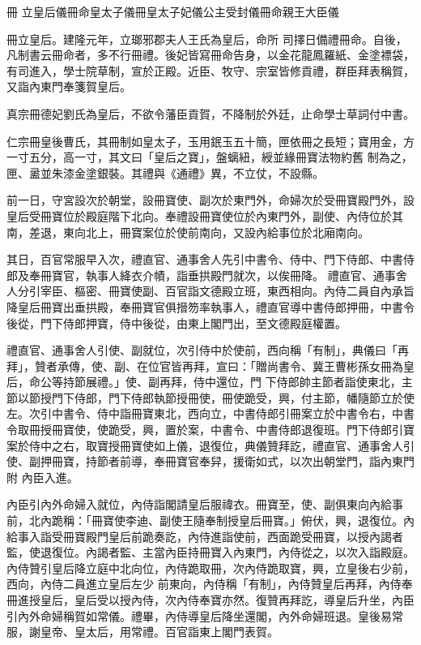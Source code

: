 
\begin{pinyinscope}

 冊
 立皇后儀冊命皇太子儀冊皇太子妃儀公主受封儀冊命親王大臣儀



 冊立皇后。建隆元年，立瑯邪郡夫人王氏為皇后，命所
 司擇日備禮冊命。自後，凡制書云冊命者，多不行冊禮。後妃皆寫冊命告身，以金花龍鳳羅紙、金塗褾袋，有司進入，學士院草制，宣於正殿。近臣、牧守、宗室皆修貢禮，群臣拜表稱賀，又詣內東門奉箋賀皇后。



 真宗冊德妃劉氏為皇后，不欲令藩臣貢賀，不降制於外廷，止命學士草詞付中書。



 仁宗冊皇後曹氏，其冊制如皇太子，玉用鈱玉五十簡，匣依冊之長短；寶用金，方一寸五分，高一寸，其文曰「皇后之寶」，盤螭紐，綬並緣冊寶法物約舊
 制為之，匣、盝並朱漆金塗銀裝。其禮與《通禮》異，不立仗，不設縣。



 前一日，守宮設次於朝堂，設冊寶使、副次於東門外，命婦次於受冊寶殿門外，設皇后受冊寶位於殿庭階下北向。奉禮設冊寶使位於內東門外，副使、內侍位於其南，差退，東向北上，冊寶案位於使前南向，又設內給事位於北廂南向。



 其日，百官常服早入次，禮直官、通事舍人先引中書令、侍中、門下侍郎、中書侍郎及奉冊寶官，執事人絳衣介幘，詣垂拱殿門就次，以俟冊降。
 禮直官、通事舍人分引宰臣、樞密、冊寶使副、百官詣文德殿立班，東西相向。內侍二員自內承旨降皇后冊寶出垂拱殿，奉冊寶官俱搢笏率執事人，禮直官導中書侍郎押冊，中書令後從，門下侍郎押寶，侍中後從，由東上閣門出，至文德殿庭權置。



 禮直官、通事舍人引使、副就位，次引侍中於使前，西向稱「有制」，典儀曰「再拜」，贊者承傳，使、副、在位官皆再拜，宣曰：「贈尚書令、冀王曹彬孫女冊為皇后，命公等持節展禮。」使、副再拜，侍中還位，門
 下侍郎帥主節者詣使東北，主節以節授門下侍郎，門下侍郎執節授冊使，冊使跪受，興，付主節，幡隨節立於使左。次引中書令、侍中詣冊寶東北，西向立，中書侍郎引冊案立於中書令右，中書令取冊授冊寶使，使跪受，興，置於案，中書令、中書侍郎退復班。門下侍郎引寶案於侍中之右，取寶授冊寶使如上儀，退復位，典儀贊拜訖，禮直官、通事舍人引使、副押冊寶，持節者前導，奉冊寶官奉舁，援衛如式，以次出朝堂門，詣內東門附
 內臣入進。



 內臣引內外命婦入就位，內侍詣閣請皇后服禕衣。冊寶至，使、副俱東向內給事前，北內跪稱：「冊寶使李迪、副使王隨奉制授皇后冊寶。」俯伏，興，退復位。內給事入詣受冊寶殿門皇后前跪奏訖，內侍進詣使前，西面跪受冊寶，以授內謁者監，使退復位。內謁者監、主當內臣持冊寶入內東門，內侍從之，以次入詣殿庭。內侍贊引皇后降立庭中北向位，內侍跪取冊，次內侍跪取寶，興，立皇後右少前，西向，內侍二員進立皇后左少
 前東向，內侍稱「有制」，內侍贊皇后再拜，內侍奉冊進授皇后，皇后受以授內侍，次內侍奉寶亦然。復贊再拜訖，導皇后升坐，內臣引內外命婦稱賀如常儀。禮畢，內侍導皇后降坐還閣，內外命婦班退。皇後易常服，謝皇帝、皇太后，用常禮。百官詣東上閣門表賀。




\end{pinyinscope}
